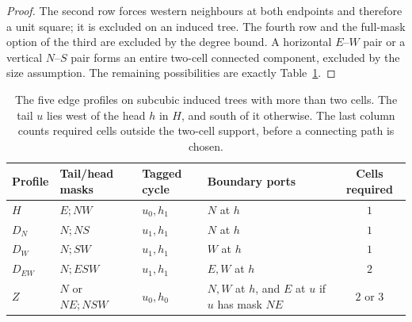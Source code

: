 \begin{proof}
The second row forces western neighbours at both endpoints and therefore
a unit square; it is excluded on an induced tree. The fourth row and
the full-mask option of the third are excluded by the degree bound.
A horizontal \(E\)--\(W\) pair or a vertical \(N\)--\(S\) pair forms an
entire two-cell connected component, excluded by the size assumption.
The remaining possibilities are exactly Table~\ref{t:profile-table}.
\end{proof}

\begin{table}[!htbp]
\centering
\small
\begin{tabularx}{\linewidth}{@{}l l l X c@{}}
\toprule
Profile & Tail/head masks & Tagged cycle & Boundary ports & Cells required\\
\midrule
\(H\) & \(E;NW\) & \(u_0,h_1\) & \(N\) at \(h\) & \(1\)\\
\(D_N\) & \(N;NS\) & \(u_1,h_1\) & \(N\) at \(h\) & \(1\)\\
\(D_W\) & \(N;SW\) & \(u_1,h_1\) & \(W\) at \(h\) & \(1\)\\
\(D_{EW}\) & \(N;ESW\) & \(u_1,h_1\) & \(E,W\) at \(h\) & \(2\)\\
\(Z\) & \(N\) or \(NE;NSW\) & \(u_0,h_0\) &
\(N,W\) at \(h\), and \(E\) at \(u\) if \(u\) has mask \(NE\) & \(2\) or \(3\)\\
\bottomrule
\end{tabularx}
\caption{The five edge profiles on subcubic induced trees with more than
two cells. The tail \(u\) lies west of the head \(h\) in \(H\), and south
of it otherwise. The last column counts required cells outside the
two-cell support, before a connecting path is chosen.}\label{t:profile-table}
\end{table}

